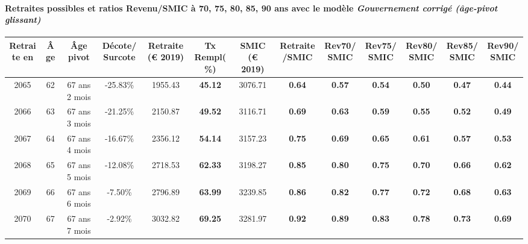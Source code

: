 \paragraph{Retraites possibles et ratios Revenu/SMIC à 70, 75, 80, 85, 90 ans avec le modèle \emph{Gouvernement corrigé (âge-pivot glissant)}}  
 
{ \scriptsize \begin{center} 
\begin{tabular}[htb]{|c|c||c|c||c|c||c||c|c|c|c|c|c|} 
\hline 
 Retraite en &  Âge &  Âge pivot &  Décote/Surcote &  Retraite (\euro{} 2019) &  Tx Rempl(\%) &  SMIC (\euro{} 2019) &  Retraite/SMIC &  Rev70/SMIC &  Rev75/SMIC &  Rev80/SMIC &  Rev85/SMIC &  Rev90/SMIC \\ 
\hline \hline 
 2065 &  62 &  67 ans 2 mois &  -25.83\% &  1955.43 &  {\bf 45.12} &  3076.71 &  {\bf {\color{red} 0.64}} &  {\bf {\color{red} 0.57}} &  {\bf {\color{red} 0.54}} &  {\bf {\color{red} 0.50}} &  {\bf {\color{red} 0.47}} &  {\bf {\color{red} 0.44}} \\ 
\hline 
 2066 &  63 &  67 ans 3 mois &  -21.25\% &  2150.87 &  {\bf 49.52} &  3116.71 &  {\bf {\color{red} 0.69}} &  {\bf {\color{red} 0.63}} &  {\bf {\color{red} 0.59}} &  {\bf {\color{red} 0.55}} &  {\bf {\color{red} 0.52}} &  {\bf {\color{red} 0.49}} \\ 
\hline 
 2067 &  64 &  67 ans 4 mois &  -16.67\% &  2356.12 &  {\bf 54.14} &  3157.23 &  {\bf {\color{red} 0.75}} &  {\bf {\color{red} 0.69}} &  {\bf {\color{red} 0.65}} &  {\bf {\color{red} 0.61}} &  {\bf {\color{red} 0.57}} &  {\bf {\color{red} 0.53}} \\ 
\hline 
 2068 &  65 &  67 ans 5 mois &  -12.08\% &  2718.53 &  {\bf 62.33} &  3198.27 &  {\bf {\color{red} 0.85}} &  {\bf {\color{red} 0.80}} &  {\bf {\color{red} 0.75}} &  {\bf {\color{red} 0.70}} &  {\bf {\color{red} 0.66}} &  {\bf {\color{red} 0.62}} \\ 
\hline 
 2069 &  66 &  67 ans 6 mois &  -7.50\% &  2796.89 &  {\bf 63.99} &  3239.85 &  {\bf {\color{red} 0.86}} &  {\bf {\color{red} 0.82}} &  {\bf {\color{red} 0.77}} &  {\bf {\color{red} 0.72}} &  {\bf {\color{red} 0.68}} &  {\bf {\color{red} 0.63}} \\ 
\hline 
 2070 &  67 &  67 ans 7 mois &  -2.92\% &  3032.82 &  {\bf 69.25} &  3281.97 &  {\bf {\color{red} 0.92}} &  {\bf {\color{red} 0.89}} &  {\bf {\color{red} 0.83}} &  {\bf {\color{red} 0.78}} &  {\bf {\color{red} 0.73}} &  {\bf {\color{red} 0.69}} \\ 
\hline 
\hline 
\end{tabular} 
\end{center} } 
